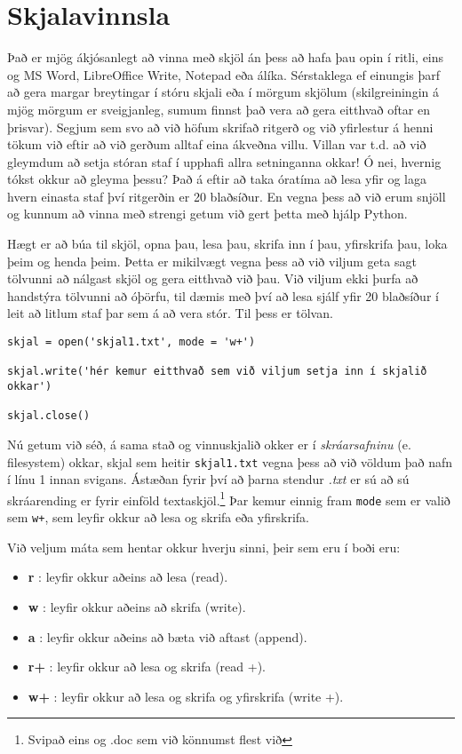 
\chapter{Skjalavinnsla}\label{k:skjalavinnsla}
Það er mjög ákjósanlegt að vinna með skjöl án þess að hafa þau opin í ritli, eins og MS Word, LibreOffice Write, Notepad eða álíka.
Sérstaklega ef einungis þarf að gera margar breytingar í stóru skjali eða í mörgum skjölum (skilgreiningin á mjög mörgum er sveigjanleg, sumum finnst það vera að gera eitthvað oftar en þrisvar).
Segjum sem svo að við höfum skrifað ritgerð og við yfirlestur á henni tökum við eftir að við gerðum alltaf eina ákveðna villu.
Villan var t.d. að við gleymdum að setja stóran staf í upphafi allra setninganna okkar!
Ó nei, hvernig tókst okkur að gleyma þessu?
Það á eftir að taka óratíma að lesa yfir og laga hvern einasta staf því ritgerðin er 20 blaðsíður.
En vegna þess að við erum snjöll og kunnum að vinna með strengi getum við gert þetta með hjálp Python.

Hægt er að búa til skjöl, opna þau, lesa þau, skrifa inn í þau, yfirskrifa þau, loka þeim og henda þeim.
Þetta er mikilvægt vegna þess að við viljum geta sagt tölvunni að nálgast skjöl og gera eitthvað við þau.
Við viljum ekki þurfa að handstýra tölvunni að óþörfu, til dæmis með því að lesa sjálf yfir 20 blaðsíður í leit að litlum staf þar sem á að vera stór.
Til þess er tölvan.

\begin{lstlisting}[caption=Hér sjáum við hvernig má búa til skjöl, label=lst:skjalavinnsla-kynning]
skjal = open('skjal1.txt', mode = 'w+') 

skjal.write('hér kemur eitthvað sem við viljum setja inn í skjalið okkar')

skjal.close()
\end{lstlisting}
\vspace{0.3cm}
Nú getum við séð, á sama stað og vinnuskjalið okker er í \textit{skráarsafninu} (e. filesystem) okkar, skjal sem heitir \texttt{skjal1.txt} vegna þess að við völdum það nafn í línu 1 innan svigans.
Ástæðan fyrir því að þarna stendur \emph{.txt} er sú að sú skráarending er fyrir einföld textaskjöl.\footnote{Svipað eins og .doc sem við könnumst flest við}
Þar kemur einnig fram \texttt{mode} sem er valið sem \texttt{w+}, sem leyfir okkur að lesa og skrifa eða yfirskrifa.
\newpage

Við veljum máta sem hentar okkur hverju sinni, þeir sem eru í boði eru:
\begin{itemize}
	\item \textbf{r} : leyfir okkur aðeins að lesa (read).
	\item \textbf{w} : leyfir okkur aðeins að skrifa (write).
	\item \textbf{a} : leyfir okkur aðeins að bæta við aftast (append).
	\item \textbf{r+} : leyfir okkur að lesa og skrifa (read +).
	\item \textbf{w+} : leyfir okkur að lesa og skrifa og yfirskrifa (write +).
\end{itemize}

